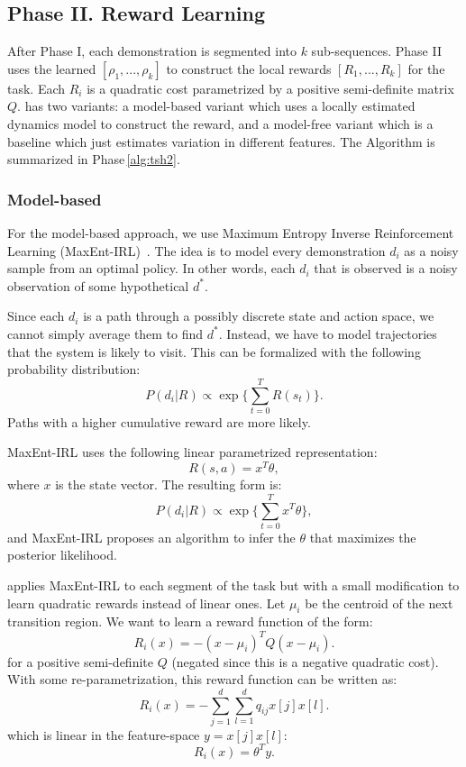 \subsection*{Phase II. Reward Learning}\label{sec:reward}
After Phase I, each demonstration is segmented into $k$ sub-sequences.
Phase II uses the learned $[\rho_1,...,\rho_k]$ to construct the local rewards $[R_1,...,R_k]$ for the task.
Each $R_i$ is a quadratic cost parametrized by a positive semi-definite matrix $Q$.
\hirl has two variants: a model-based variant which uses a locally estimated dynamics model to construct the reward, and a model-free variant which is a baseline which just estimates variation in different features.
The Algorithm is summarized in Phase\,\ref{alg:tsh2}.

\vspace{-15pt}
\subsubsection{Model-based}
For the model-based approach, we use Maximum Entropy Inverse Reinforcement Learning (MaxEnt-IRL)~\cite{DBLP:conf/aaai/ZiebartMBD08}. 
The idea is to model every demonstration $d_i$ as a noisy sample from an optimal policy.
In other words, each $d_i$ that is observed is a noisy observation of some hypothetical $d^*$.

Since each $d_i$ is a path through a possibly discrete state and action space, we cannot simply average them to find $d^*$.
Instead, we have to model trajectories that the system is likely to visit. 
This can be formalized with the following probability distribution:
\[
P(d_i | R) \propto \exp \{ \sum_{t=0}^T R(s_t) \}.
\]
Paths with a higher cumulative reward are more likely.

MaxEnt-IRL uses the following linear parametrized representation:
\[
R(s,a) = x^T \theta,
\]
where $x$ is the state vector. The resulting form is:
\[
P(d_i | R) \propto \exp \{ \sum_{t=0}^T x^T \theta \},
\]
and MaxEnt-IRL proposes an algorithm to infer the $\theta$ that maximizes the posterior likelihood.

\hirl applies MaxEnt-IRL to each segment of the task but with a small modification to learn quadratic rewards instead of linear ones. 
Let $\mu_i$ be the centroid of the next transition region.
We want to learn a reward function of the form:
\[
R_i(x) = -(x-\mu_i)^T Q (x-\mu_i).
\]
for a positive semi-definite $Q$ (negated since this is a negative quadratic cost).
With some re-parametrization, this reward function can be written as:
\[
R_i(x) = -\sum_{j=1}^d \sum_{l=1}^d q_{ij} x[j] x[l].
\]
which is linear in the feature-space $y = x[j] x[l]$:
\[
R_i(x) = \theta^T y.
\]


